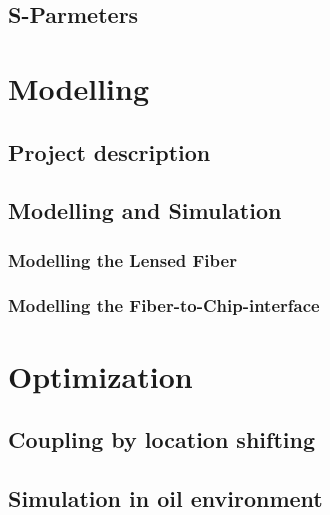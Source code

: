 \section{S-Parmeters}


\chapter{Modelling}
\label{chp:model}

\section{Project description}


\section{Modelling and Simulation}
\label{sect:model_simulation}

\subsection{Modelling the Lensed Fiber}
\label{sect:model_model_model_TLF}

\subsection{Modelling the Fiber-to-Chip-interface}
\label{sect:model_model_fiber2chip}


%
\chapter{Optimization}
\label{chp:optim}


\section{Coupling by location shifting}
\label{sect:optim_shift}


\section{Simulation in oil environment}


